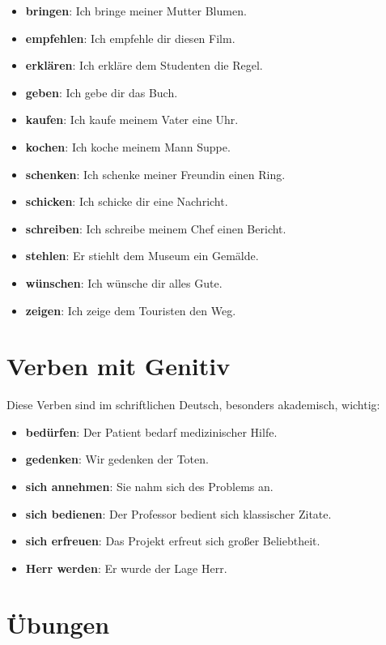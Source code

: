 \begin{itemize}
    \item \textbf{bringen}: Ich bringe meiner Mutter Blumen.
    \item \textbf{empfehlen}: Ich empfehle dir diesen Film.
    \item \textbf{erklären}: Ich erkläre dem Studenten die Regel.
    \item \textbf{geben}: Ich gebe dir das Buch.
    \item \textbf{kaufen}: Ich kaufe meinem Vater eine Uhr.
    \item \textbf{kochen}: Ich koche meinem Mann Suppe.
    \item \textbf{schenken}: Ich schenke meiner Freundin einen Ring.
    \item \textbf{schicken}: Ich schicke dir eine Nachricht.
    \item \textbf{schreiben}: Ich schreibe meinem Chef einen Bericht.
    \item \textbf{stehlen}: Er stiehlt dem Museum ein Gemälde.
    \item \textbf{wünschen}: Ich wünsche dir alles Gute.
    \item \textbf{zeigen}: Ich zeige dem Touristen den Weg.
\end{itemize}

\section{Verben mit Genitiv}
\label{sec:VerbenMitGen}

Diese Verben sind im schriftlichen Deutsch, besonders akademisch, wichtig:

\begin{itemize}
    \item \textbf{bedürfen}: Der Patient bedarf medizinischer Hilfe.
    \item \textbf{gedenken}: Wir gedenken der Toten.
    \item \textbf{sich annehmen}: Sie nahm sich des Problems an.
    \item \textbf{sich bedienen}: Der Professor bedient sich klassischer Zitate.
    \item \textbf{sich erfreuen}: Das Projekt erfreut sich großer Beliebtheit.
    \item \textbf{Herr werden}: Er wurde der Lage Herr.
\end{itemize}

\section{Übungen}
\label{sec:NomenVerbUebungen}

